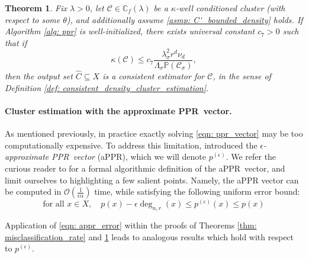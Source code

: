 \documentclass{article}
\newcommand{\1}{\mathbf{1}}
\newcommand{\pbf}{p}        %
\newcommand{\Xbf}{X}             %
\newcommand{\Pbb}{\mathbb{P}}
\newcommand{\Cbb}{\mathbb{C}}
\newcommand{\Cset}{\mathcal{C}}
\newcommand{\Csig}{\Cset_{\sigma}}
\newcommand{\Cest}{\widehat{C}}
\newcommand{\pprspace}{{\sc PPR~}}
\theoremstyle{aldenthm}
\newtheorem{theorem}{Theorem}
\theoremstyle{aldenrmrk}
\begin{document}
\begin{theorem}
	\label{thm: consistent_recovery_of_density_clusters}
	Fix $\lambda > 0$, let $\Cset \in \Cbb_f(\lambda)$ be a $\kappa$-well conditioned cluster (with respect to some $\theta$), and additionally assume \ref{asmp: C'_bounded_density} holds. If Algorithm \ref{alg: ppr} is well-initialized, there exists universal constant $c_7 > 0$ such that if
	\begin{equation}
	\label{eqn: kappa_ub}
	\kappa(\Cset) \leq c_7 \frac{\lambda_{\sigma}^2r^d \nu_d}{\Lambda_{\sigma}\Pbb(\Csig)},
	\end{equation}
	then the output set $\Cest \subseteq \Xbf$ is a consistent estimator for $\Cset$, in the sense of Definition \ref{def: consistent_density_cluster_estimation}.
\end{theorem}

\paragraph{Cluster estimation with the approximate \pprspace vector.}

As mentioned previously, in practice exactly solving \eqref{eqn: ppr_vector} may be too computationally expensive. To address this limitation, \citet{andersen2006} introduced the \emph{$\epsilon$-approximate \pprspace vector} (aPPR), which we will denote $\pbf^{(\epsilon)}$. We refer the curious reader to \cite{andersen2006} for a formal algorithmic definition of the a\pprspace vector, and limit ourselves to highlighting a few salient points. Namely, the aPPR vector can be computed in $\mathcal{O}\left(\frac{1}{\epsilon \alpha}\right)$ time, while satisfying the following uniform error bound:
\begin{equation}
\label{eqn: appr_error}
\textrm{for all $x \in \Xbf$}, \quad \pbf(x) - \epsilon \deg_{n,r}(x)\leq \pbf^{(\epsilon)}(x) \leq \pbf(x)
\end{equation}

Application of \eqref{eqn: appr_error} within the proofs of Theorems \ref{thm: misclassification_rate} and \ref{thm: consistent_recovery_of_density_clusters} leads to analogous results which hold with respect to $\pbf^{(\epsilon)}$.
\end{document}
